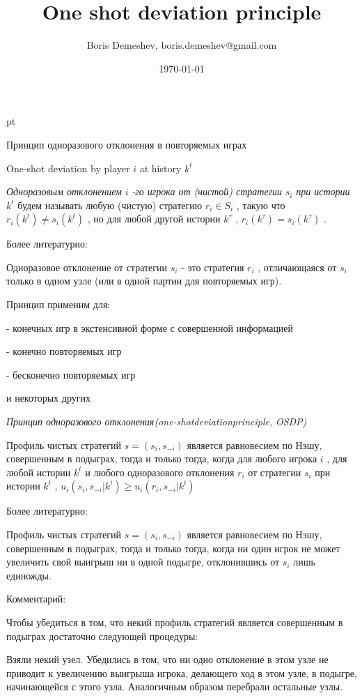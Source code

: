 \documentclass[pdftex,12pt,a4paper]{article}
\title{One shot deviation principle}
\author{Boris Demeshev, boris.demeshev@gmail.com}
\date{\today}
\begin{document}
 pt %

Принцип одноразового отклонения в повторяемых играх

One-shot deviation by player  $i$  at history  $k^{t} $

{\it Одноразовым отклонением } $i$ {\it -го игрока от (чистой) стратегии } $s_{i} $ {\it  при истории } $k^{t} $ {\it  }будем называть любую (чистую) стратегию  $r_{i} \in S_{i} $ , такую что  $r_{i} \left(k^{t} \right)\ne s_{i} \left(k^{t} \right)$ , но для любой другой истории  $k^{\tau } $ ,  $r_{i} \left(k^{\tau } \right)=s_{i} \left(k^{\tau } \right)$ .

Более литературно:

Одноразовое отклонение от стратегии  $s_{i} $  - это стратегия  $r_{i} $ , отличающаяся от  $s_{i} $  только в одном узле (или в одной партии для повторяемых игр).

Принцип применим для:

- конечных игр в экстенсивной форме с совершенной информацией

- конечно повторяемых игр

- бесконечно повторяемых игр

и некоторых других

{\it Принцип одноразового отклонения}{\it (}{\it one}{\it -}{\it shot}{\it  }{\it deviation}{\it  }{\it principle}{\it , }{\it OSDP}{\it )}

Профиль чистых стратегий  $s=\left(s_{i} ,s_{-i} \right)$  является равновесием по Нэшу, совершенным в подыграх, тогда и только тогда, когда для любого игрока  $i$ , для любой истории  $k^{t} $  и любого одноразового отклонения  $r_{i} $  от стратегии  $s_{i} $  при истории  $k^{t} $ ,  $u_{i} \left(s_{i} ,s_{-i} |k^{t} \right)\ge u_{i} \left(r_{i} ,s_{-i} |k^{t} \right)$

Более литературно:

Профиль чистых стратегий  $s=\left(s_{i} ,s_{-i} \right)$  является равновесием по Нэшу, совершенным в подыграх, тогда и только тогда, когда ни один игрок не может увеличить свой выигрыш ни в одной подыгре, отклонившись от  $s_{i} $  лишь единожды.

Комментарий:

Чтобы убедиться в том, что некий профиль стратегий является совершенным в подыграх достаточно следующей процедуры:

Взяли некий узел. Убедились в том, что ни одно отклонение в этом узле не приводит к увеличению выигрыша игрока, делающего ход в этом узле, в подыгре, начинающейся с этого узла. Аналогичным образом перебрали остальные узлы.
\end{document}
